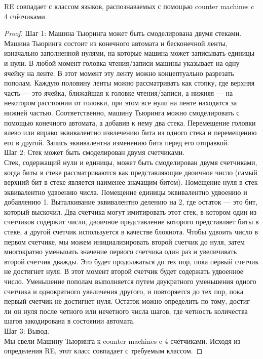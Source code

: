     
    \begin{Thm}
         \textsc{RE} совпадает с классом языков, распознаваемых с помощью counter machines c 4 счётчиками.
    \end{Thm}
    \begin{proof}
        Шаг 1: Машина Тьюринга может быть смоделирована двумя стеками.\\
        Машина Тьюринга состоит из конечного автомата и бесконечной ленты, изначально заполненной нулями, на которые машина может записывать единицы и нули. В любой момент головка чтения/записи машины указывает на одну ячейку на ленте. В этот момент эту ленту можно концептуально разрезать пополам. Каждую половину ленты можно рассматривать как стопку, где верхняя часть — это ячейка, ближайшая к головке чтения/записи, а нижняя — на некотором расстоянии от головки, при этом все нули на ленте находятся за нижней частью. Соответственно, машину Тьюринга можно смоделировать с помощью конечного автомата, а добавив к нему два стека. Перемещение головки влево или вправо эквивалентно извлечению бита из одного стека и перемещению его в другой. Запись эквивалентна изменению бита перед его отправкой.\\
        Шаг 2: Стек может быть смоделирован двумя счетчиками.\\
        Стек, содержащий нули и единицы, может быть смоделирован двумя счетчиками, когда биты в стеке рассматриваются как представляющие двоичное число (самый верхний бит в стеке является наименее значащим битом). Помещение нуля в стек эквивалентно удвоению числа. Помещение единицы эквивалентно удвоению и добавлению 1. Выталкивание эквивалентно делению на 2, где остаток --- это бит, который выскочил. Два счетчика могут имитировать этот стек, в котором один из счетчиков содержит число, двоичное представление которого представляет биты в стеке, а другой счетчик используется в качестве блокнота. Чтобы удвоить число в первом счетчике, мы можем инициализировать второй счетчик до нуля, затем многократно уменьшать значение первого счетчика один раз и увеличивать второй счетчик дважды. Это будет продолжаться до тех пор, пока первый счетчик не достигнет нуля. В этот момент второй счетчик будет содержать удвоенное число. Уменьшение пополам выполняется путем двукратного уменьшения одного счетчика и однократного увеличения другого, и повторяется до тех пор, пока первый счетчик не достигнет нуля. Остаток можно определить по тому, достиг ли он нуля после четного или нечетного числа шагов, где четность количества шагов закодирована в состоянии автомата.\\
        Шаг 3: Вывод.\\
        Мы свели Машину Тьюринга к counter machines c 4 счётчиками. Исходя из определения \textsc{RE}, этот класс совпадает с требуемым классом.
    \end{proof}
    
